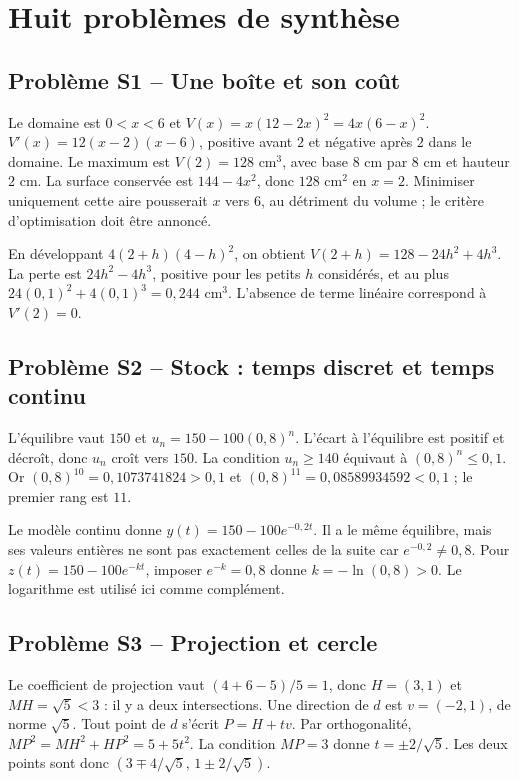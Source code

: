 \chapter{Huit problèmes de synthèse}
\section*{Problème S1 -- Une boîte et son coût}

Le domaine est $0<x<6$ et $V(x)=x(12-2x)^2=4x(6-x)^2$.
$V'(x)=12(x-2)(x-6)$, positive avant $2$ et négative après $2$ dans le domaine.
Le maximum est $V(2)=128$ cm$^3$, avec base $8$ cm par $8$ cm et hauteur $2$ cm.
La surface conservée est $144-4x^2$, donc $128$ cm$^2$ en $x=2$.
Minimiser uniquement cette aire pousserait $x$ vers $6$, au détriment du volume ;
le critère d'optimisation doit être annoncé.

En développant $4(2+h)(4-h)^2$, on obtient
$V(2+h)=128-24h^2+4h^3$. La perte est $24h^2-4h^3$,
positive pour les petits $h$ considérés, et au plus
$24(0{,}1)^2+4(0{,}1)^3=0{,}244$ cm$^3$.
L'absence de terme linéaire correspond à $V'(2)=0$.

\section*{Problème S2 -- Stock : temps discret et temps continu}

L'équilibre vaut $150$ et $u_n=150-100(0{,}8)^n$.
L'écart à l'équilibre est positif et décroît, donc $u_n$ croît vers $150$.
La condition $u_n\ge140$ équivaut à $(0{,}8)^n\le0{,}1$.
Or $(0{,}8)^{10}=0{,}1073741824>0{,}1$ et
$(0{,}8)^{11}=0{,}08589934592<0{,}1$ ; le premier rang est $11$.

Le modèle continu donne $y(t)=150-100e^{-0{,}2t}$.
Il a le même équilibre, mais ses valeurs entières ne sont pas exactement
celles de la suite car $e^{-0{,}2}\ne0{,}8$.
Pour $z(t)=150-100e^{-kt}$, imposer $e^{-k}=0{,}8$ donne
$k=-\ln(0{,}8)>0$. Le logarithme est utilisé ici comme complément.

\section*{Problème S3 -- Projection et cercle}

Le coefficient de projection vaut $(4+6-5)/5=1$,
donc $H=(3,1)$ et $MH=\sqrt5<3$ : il y a deux intersections.
Une direction de $d$ est $v=(-2,1)$, de norme $\sqrt5$.
Tout point de $d$ s'écrit $P=H+tv$.
Par orthogonalité, $MP^2=MH^2+HP^2=5+5t^2$.
La condition $MP=3$ donne $t=\pm2/\sqrt5$.
Les deux points sont donc
$(3\mp4/\sqrt5,\,1\pm2/\sqrt5)$.


